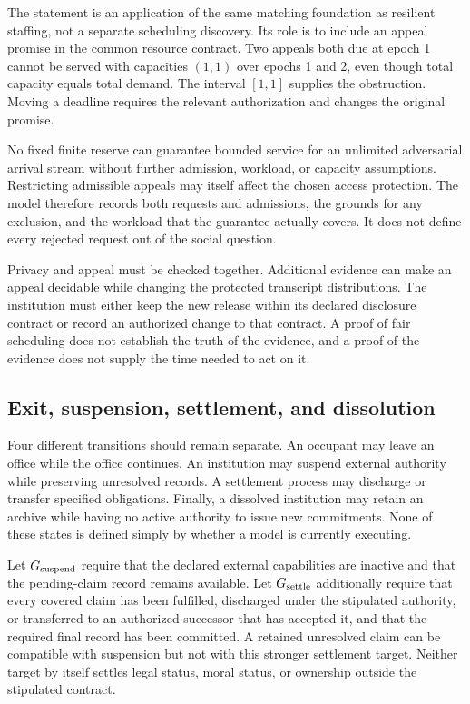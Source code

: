 \documentclass[11pt,letterpaper]{article}
\theoremstyle{plain}
\theoremstyle{definition}
\theoremstyle{remark}
\begin{document}
The statement is an application of the same matching foundation as resilient staffing, not a separate scheduling discovery. Its role is to include an appeal promise in the common resource contract. Two appeals both due at epoch 1 cannot be served with capacities $(1,1)$ over epochs 1 and 2, even though total capacity equals total demand. The interval $[1,1]$ supplies the obstruction. Moving a deadline requires the relevant authorization and changes the original promise.

No fixed finite reserve can guarantee bounded service for an unlimited adversarial arrival stream without further admission, workload, or capacity assumptions. Restricting admissible appeals may itself affect the chosen access protection. The model therefore records both requests and admissions, the grounds for any exclusion, and the workload that the guarantee actually covers. It does not define every rejected request out of the social question.

Privacy and appeal must be checked together. Additional evidence can make an appeal decidable while changing the protected transcript distributions. The institution must either keep the new release within its declared disclosure contract or record an authorized change to that contract. A proof of fair scheduling does not establish the truth of the evidence, and a proof of the evidence does not supply the time needed to act on it.

\subsection{Exit, suspension, settlement, and dissolution}\label{sec:authorized-endings}

Four different transitions should remain separate. An occupant may leave an office while the office continues. An institution may suspend external authority while preserving unresolved records. A settlement process may discharge or transfer specified obligations. Finally, a dissolved institution may retain an archive while having no active authority to issue new commitments. None of these states is defined simply by whether a model is currently executing.

Let $G_{\rm suspend}$ require that the declared external capabilities are inactive and that the pending-claim record remains available. Let $G_{\rm settle}$ additionally require that every covered claim has been fulfilled, discharged under the stipulated authority, or transferred to an authorized successor that has accepted it, and that the required final record has been committed. A retained unresolved claim can be compatible with suspension but not with this stronger settlement target. Neither target by itself settles legal status, moral status, or ownership outside the stipulated contract.
\end{document}
